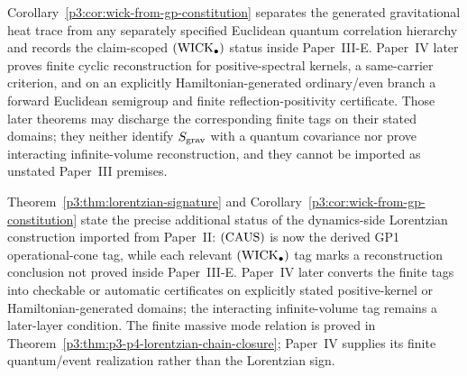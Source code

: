 \documentclass[12pt,a4paper]{article}
\begin{document}
\begin{remark}
\label{p3:rem:p4-euclidean-hamiltonian-closure}
Corollary~\ref{p3:cor:wick-from-gp-constitution} separates the generated
gravitational heat trace from any separately specified Euclidean quantum
correlation hierarchy and records the claim-scoped \(({\rm WICK}_\bullet)\)
status inside Paper~III-E.  Paper~IV later proves finite cyclic reconstruction
for positive-spectral kernels, a same-carrier criterion, and on an explicitly
Hamiltonian-generated ordinary/even branch a forward Euclidean semigroup and
finite reflection-positivity certificate.  Those later theorems may discharge
the corresponding finite tags on their stated domains; they neither identify
\(S_{\rm grav}\) with a quantum covariance nor prove interacting
infinite-volume reconstruction, and they cannot be imported as unstated
Paper~III premises.
\end{remark}


\begin{remark}
Theorem~\ref{p3:thm:lorentzian-signature} and
Corollary~\ref{p3:cor:wick-from-gp-constitution} state the precise additional
status of the dynamics-side Lorentzian construction imported from Paper~II:
\(({\rm CAUS})\) is now the derived GP1 operational-cone tag, while each
relevant \(({\rm WICK}_\bullet)\) tag marks a reconstruction conclusion not
proved inside Paper~III-E.  Paper~IV later converts the finite tags into
checkable or automatic certificates on explicitly stated positive-kernel or
Hamiltonian-generated domains; the interacting infinite-volume tag remains a
later-layer condition.  The finite massive mode relation is proved in
Theorem~\ref{p3:thm:p3-p4-lorentzian-chain-closure}; Paper~IV supplies its
finite quantum/event realization rather than the Lorentzian sign.
\end{remark}
\end{document}
